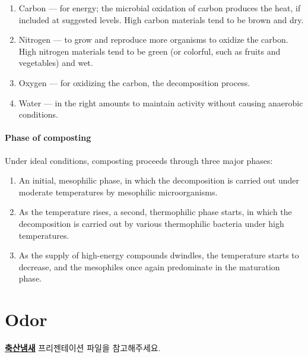 \documentclass[]{book}
\providecommand{\tightlist}{%
  \setlength{\itemsep}{0pt}\setlength{\parskip}{0pt}}
\begin{document}
\begin{enumerate}
\def\labelenumi{\arabic{enumi}.}
\tightlist
\item
  Carbon --- for energy; the microbial oxidation of carbon produces the heat, if included at suggested levels. High carbon materials tend to be brown and dry.
\item
  Nitrogen --- to grow and reproduce more organisms to oxidize the carbon. High nitrogen materials tend to be green (or colorful, such as fruits and vegetables) and wet.
\item
  Oxygen --- for oxidizing the carbon, the decomposition process.
\item
  Water --- in the right amounts to maintain activity without causing anaerobic conditions.
\end{enumerate}

\hypertarget{phase-of-composting}{%
\subsubsection{Phase of composting}\label{phase-of-composting}}

Under ideal conditions, composting proceeds through three major phases:

\begin{enumerate}
\def\labelenumi{\arabic{enumi}.}
\tightlist
\item
  An initial, mesophilic phase, in which the decomposition is carried out under moderate temperatures by mesophilic microorganisms.
\item
  As the temperature rises, a second, thermophilic phase starts, in which the decomposition is carried out by various thermophilic bacteria under high temperatures.
\item
  As the supply of high-energy compounds dwindles, the temperature starts to decrease, and the mesophiles once again predominate in the maturation phase.
\end{enumerate}

\hypertarget{odor}{%
\chapter{Odor}\label{odor}}

\textbf{\href{https://drive.google.com/open?id=1Hze2tdsbKGxIF02kD9K_9p8RFX9vLFoE}{축산냄새}} 프리젠테이션 파일을 참고해주세요.


\end{document}
